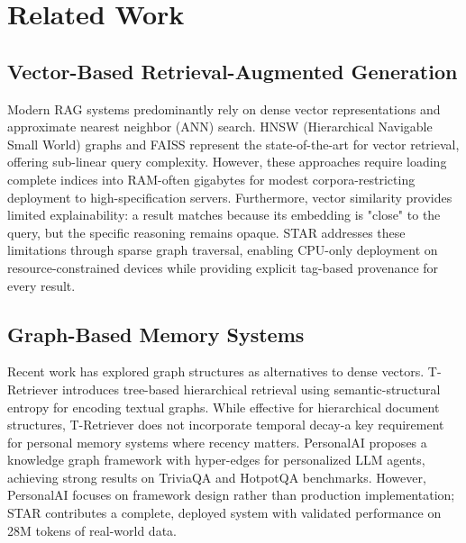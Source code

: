 
\section{Related Work}
\label{sec:related}

\subsection{Vector-Based Retrieval-Augmented Generation}

Modern RAG systems predominantly rely on dense vector representations and approximate nearest neighbor (ANN) search. HNSW (Hierarchical Navigable Small World) graphs \cite{malkov2018efficient} and FAISS \cite{johnson2019billion} represent the state-of-the-art for vector retrieval, offering sub-linear query complexity. However, these approaches require loading complete indices into RAM-often gigabytes for modest corpora-restricting deployment to high-specification servers. Furthermore, vector similarity provides limited explainability: a result matches because its embedding is "close" to the query, but the specific reasoning remains opaque. STAR addresses these limitations through sparse graph traversal, enabling CPU-only deployment on resource-constrained devices while providing explicit tag-based provenance for every result.

\subsection{Graph-Based Memory Systems}

Recent work has explored graph structures as alternatives to dense vectors. T-Retriever \cite{wei2026tretriever} introduces tree-based hierarchical retrieval using semantic-structural entropy for encoding textual graphs. While effective for hierarchical document structures, T-Retriever does not incorporate temporal decay-a key requirement for personal memory systems where recency matters. PersonalAI \cite{menschikov2025personalai} proposes a knowledge graph framework with hyper-edges for personalized LLM agents, achieving strong results on TriviaQA and HotpotQA benchmarks. However, PersonalAI focuses on framework design rather than production implementation; STAR contributes a complete, deployed system with validated performance on 28M tokens of real-world data.

